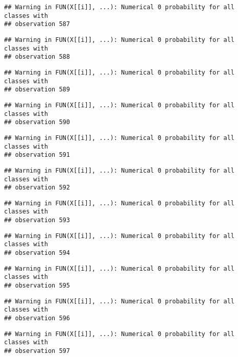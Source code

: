 \documentclass[
]{article}
\begin{document}
\begin{verbatim}
## Warning in FUN(X[[i]], ...): Numerical 0 probability for all classes with
## observation 587
\end{verbatim}

\begin{verbatim}
## Warning in FUN(X[[i]], ...): Numerical 0 probability for all classes with
## observation 588
\end{verbatim}

\begin{verbatim}
## Warning in FUN(X[[i]], ...): Numerical 0 probability for all classes with
## observation 589
\end{verbatim}

\begin{verbatim}
## Warning in FUN(X[[i]], ...): Numerical 0 probability for all classes with
## observation 590
\end{verbatim}

\begin{verbatim}
## Warning in FUN(X[[i]], ...): Numerical 0 probability for all classes with
## observation 591
\end{verbatim}

\begin{verbatim}
## Warning in FUN(X[[i]], ...): Numerical 0 probability for all classes with
## observation 592
\end{verbatim}

\begin{verbatim}
## Warning in FUN(X[[i]], ...): Numerical 0 probability for all classes with
## observation 593
\end{verbatim}

\begin{verbatim}
## Warning in FUN(X[[i]], ...): Numerical 0 probability for all classes with
## observation 594
\end{verbatim}

\begin{verbatim}
## Warning in FUN(X[[i]], ...): Numerical 0 probability for all classes with
## observation 595
\end{verbatim}

\begin{verbatim}
## Warning in FUN(X[[i]], ...): Numerical 0 probability for all classes with
## observation 596
\end{verbatim}

\begin{verbatim}
## Warning in FUN(X[[i]], ...): Numerical 0 probability for all classes with
## observation 597
\end{verbatim}
\end{document}
